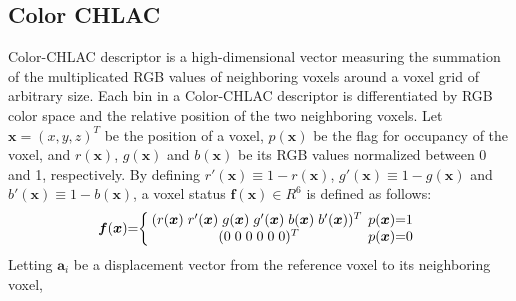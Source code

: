 \documentclass[conference]{sty/IEEEtran}
\begin{document}
\subsection{Color CHLAC}
\label{sec:color_chlac}
Color-CHLAC descriptor is a high-dimensional vector measuring the summation of the 
multiplicated RGB values of neighboring voxels around a voxel grid of arbitrary size. 
Each bin in a Color-CHLAC descriptor is differentiated by RGB color space and the 
relative position of the two neighboring voxels. 
Let $\bm{x}=(x,y,z)^T$ be the position of a voxel, $p(\bm{x})$ be the flag for occupancy 
of the voxel, and $r(\bm{x})$, $g(\bm{x})$ and $b(\bm{x})$ be its RGB values normalized 
between 0 and 1, respectively.  By defining 
$r'(\bm{x}) \equiv 1 - r(\bm{x})$, $g'(\bm{x}) \equiv 1 - g(\bm{x})$ and $b'(\bm{x}) \equiv 1 - b(\bm{x})$, 
a voxel status $\bm{f}(\bm{x})\in R^6$ is defined as follows: 
\begin{eqnarray}
  \label{eq:voxel}
  \bm{f}({\bm x})\hspace{-1mm}=\hspace{-1mm}\left\{
  \begin{array}{cc}
    \hspace{-1mm}
    (r({\bm x})\hspace{1mm} r'({\bm x}) \hspace{1mm}g({\bm x}) \hspace{1mm}g'({\bm x}) \hspace{1mm}b({\bm x}) \hspace{1mm}b'({\bm x}))^T & \hspace{-2mm}p({\bm x})\hspace{-1mm}=\hspace{-1mm}1 \\
    (0\hspace{1mm}0\hspace{1mm}0\hspace{1mm}0\hspace{1mm}0\hspace{1mm}0)^T & \hspace{-2mm}p({\bm x})\hspace{-1mm}=\hspace{-1mm}0
  \end{array}\right.
\end{eqnarray}
%
Letting ${\bm a_i}$ be a displacement vector from the reference voxel to its neighboring voxel, 
\end{document}
